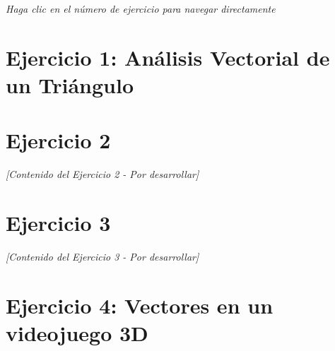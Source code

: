 \documentclass{article}
\begin{document}
\vspace{1cm}

\begin{center}
\textcolor{cenfotecgray}{\textit{Haga clic en el número de ejercicio para navegar directamente}}
\end{center}

\newpage

\hypertarget{ejercicio1}{}
\label{ejercicio1}
\section*{Ejercicio 1: Análisis Vectorial de un Triángulo}



\newpage

\hypertarget{ejercicio2}{}
\label{ejercicio2}
\section*{Ejercicio 2}
\textit{[Contenido del Ejercicio 2 - Por desarrollar]}

\newpage

\hypertarget{ejercicio3}{}
\label{ejercicio3}
\section*{Ejercicio 3}
\textit{[Contenido del Ejercicio 3 - Por desarrollar]}

\newpage

\hypertarget{ejercicio4}{}
\label{ejercicio4}
\section*{Ejercicio 4: Vectores en un videojuego 3D}


\end{document}
